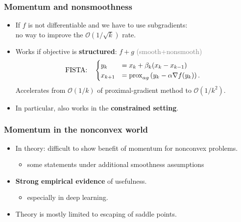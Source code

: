 \documentclass[aspectratio=149]{beamer}
\begin{document}
\begin{frame}
  \frametitle{Momentum and nonsmoothness}
  \begin{itemize}
    \item If $f$ is not differentiable and we have to use subgradients:\\
          no way to improve the $\mathcal{O}(1/\sqrt{k})$ rate.
    \item Works if objective is \textbf{structured}: $f+g$ \textcolor{gray}{(smooth+nonsmooth)}
          \begin{equation}
            \text{FISTA:}\quad \begin{cases}
              y_{k} &= x_k + \beta_k (x_k - x_{k-1}) \\
              x_{k+1} &= \operatorname{prox}^{}_{\alpha g}\left(y_k - \alpha \nabla f(y_k) \right).
            \end{cases}
          \end{equation}
          Accelerates from $\mathcal{O}(1/k)$ of proximal-gradient method to $\mathcal{O}(1/k^2)$.
    \item In particular, also works in the \textbf{constrained setting}.
  \end{itemize}

\end{frame}


\begin{frame}
  \frametitle{Momentum in the nonconvex world}
  \begin{itemize}
    \item In theory: difficult to show benefit of momentum for nonconvex problems.
    \begin{itemize}
      \item some statements under additional smoothness assumptions
    \end{itemize}
    \item \textbf{Strong empirical evidence} of usefulness.
        \begin{itemize}
          \item especially in deep learning.
        \end{itemize}
    \item Theory is mostly limited to escaping of saddle points.
  \end{itemize}
\end{frame}
\end{document}

